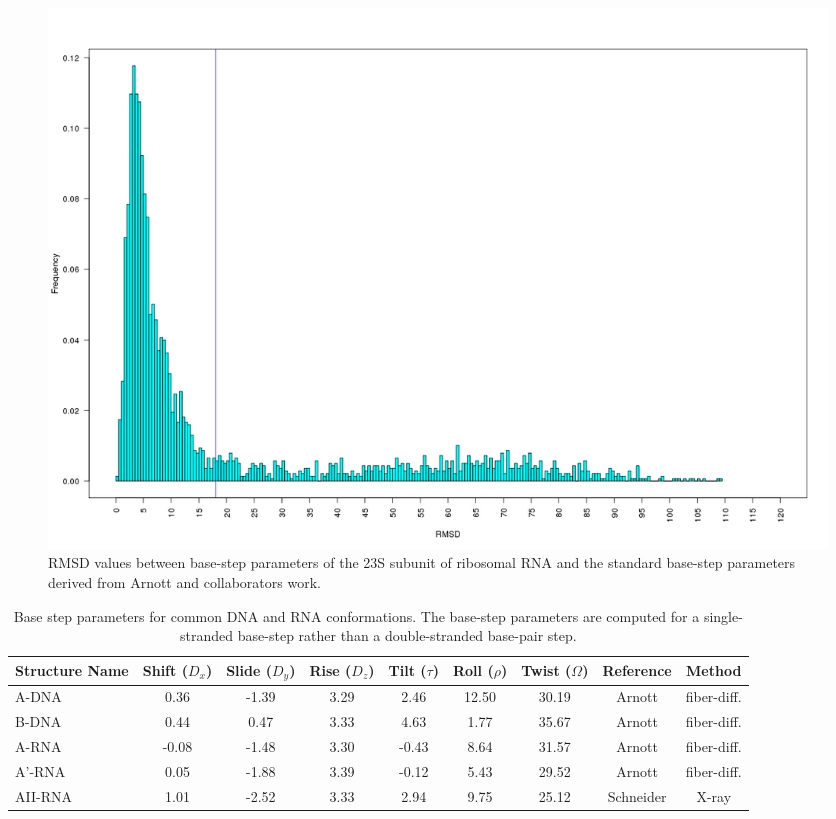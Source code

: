 \begin{figure}[ht]
 \centering
\includegraphics[angle=0, scale=0.3]{Chapter2/dormsd.png}
\caption{RMSD values between base-step parameters of the 23S subunit of
  ribosomal RNA and the standard base-step parameters derived from
  Arnott and collaborators \cite{arnott1973} work.}
 \label{fig:dormsd}
\end{figure}

\begin{table}[ht]
\begin{center}
{\small
\begin{tabular}{p{1.4cm}|c|c|c|c|c|c|c|c}
\hline
\textbf{Structure Name} & Shift ($D_x$) & Slide ($D_y$) & Rise ($D_z$) & Tilt
($\tau$) & Roll ($\rho$) & Twist ($\Omega$) & \textbf{Reference} &
\textbf{Method} \\ \hline
A-DNA & 0.36 & -1.39 & 3.29 & 2.46 & 12.50 & 30.19 & Arnott
\cite{arnott1999} & fiber-diff. \\ \hline
B-DNA & 0.44 & 0.47 & 3.33 & 4.63 & 1.77 & 35.67   & Arnott
\cite{arnott1999} & fiber-diff. \\ \hline
A-RNA & -0.08 & -1.48 & 3.30 & -0.43 & 8.64 & 31.57 & Arnott
\cite{arnott1999} & fiber-diff. \\ \hline
A'-RNA & 0.05 & -1.88 & 3.39 & -0.12 & 5.43 & 29.52 & Arnott
\cite{arnott1999} & fiber-diff. \\ \hline
AII-RNA & 1.01 & -2.52 & 3.33 & 2.94 & 9.75 & 25.12 & Schneider
\cite{schneider2004} & X-ray \\ \hline
\end{tabular}
}
\caption{Base step parameters for common DNA and RNA
  conformations. The base-step parameters are computed for
  a single-stranded base-step rather than a double-stranded base-pair step.}
\end{center}
\label{tab:conformations}
\end{table}

